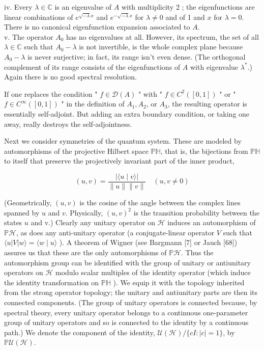 \documentclass[10pt, letterpaper]{article}
\begin{document}
iv. Every $\lambda \in \mathbb{C}$ is an eigenvalue of $A$ with multiplicity 2 ; the eigenfunctions are linear combinations of $e^{\sqrt{-\lambda} x}$ and $e^{-\sqrt{-\lambda} x}$ for $\lambda \neq 0$ and of 1 and $x$ for $\lambda=0$. There is no canonical eigenfunction expansion associated to $A$.\\
v. The operator $A_{0}$ has no eigenvalues at all. However, its spectrum, the set of all $\lambda \in \mathbb{C}$ such that $A_{0}-\lambda$ is not invertible, is the whole complex plane because $A_{0}-\lambda$ is never surjective; in fact, its range isn't even dense. (The orthogonal complement of its range consists of the eigenfunctions of $A$ with eigenvalue $\lambda^{*}$.) Again there is no good spectral resolution.

If one replaces the condition " $f \in \mathcal{D}(A)$ " with " $f \in C^{2}([0,1])$ " or " $f \in C^{\infty}([0,1])$ " in the definition of $A_{1}, A_{2}$, or $A_{3}$, the resulting operator is essentially self-adjoint. But adding an extra boundary condition, or taking one away, really destroys the self-adjointness.

Next we consider symmetries of the quantum system. These are modeled by automorphisms of the projective Hilbert space $\mathbb{P H}$, that is, the bijections from $\mathbb{P H}$ to itself that preserve the projectively invariant part of the inner product,

$$
(u, v)=\frac{|\langle u \mid v\rangle|}{\|u\|\|v\|} \quad(u, v \neq 0)
$$

(Geometrically, $(u, v)$ is the cosine of the angle between the complex lines spanned by $u$ and $v$. Physically, $(u, v)^{2}$ is the transition probability between the states $u$ and v.) Clearly any unitary operator on $\mathcal{H}$ induces an automorphism of $\mathbb{P} \mathcal{H}$, as does any anti-unitary operator (a conjugate-linear operator $V$ such that $\langle u| V|w\rangle=\langle w \mid u\rangle$ ). A theorem of Wigner (see Bargmann [7] or Jauch [68]) assures us that these are the only automorphisms of $\mathbb{P} \mathcal{H}$. Thus the automorphism group can be identified with the group of unitary or antiunitary operators on $\mathcal{H}$ modulo scalar multiples of the identity operator (which induce the identity transformation on $\mathbb{P H}$ ). We equip it with the topology inherited from the strong operator topology; the unitary and antiunitary parts are then its connected components. (The group of unitary operators is connected because, by spectral theory, every unitary operator belongs to a continuous one-parameter group of unitary operators and so is connected to the identity by a continuous path.) We denote the component of the identity, $\mathcal{U}(\mathcal{H}) /\{c I:|c|=1\}$, by $\mathbb{P} \mathcal{U}(\mathcal{H})$.
\end{document}
